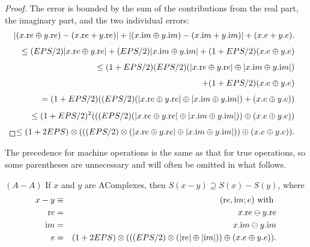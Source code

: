 \begin{proof}{}
The error is bounded by the sum of the contributions from the real part, the imaginary part, and the two individual errors:
\begin{eqnarray*}
 & &\hskip-20pt |(x.{\mathrm re} \oplus y.{\mathrm re}) -(x.{\mathrm re} + y.{\mathrm re})| + |(x.{\mathrm im} \oplus y.{\mathrm im}) -
(x.{\mathrm im} + y.{\mathrm im})| + (x.e + y.e).\\[4pt]
&&\hskip-12pt \le (EPS/2) |x.{\mathrm re} \oplus y.{\mathrm re}| + (EPS/2) |x.{\mathrm im} \oplus y.{\mathrm im}| + 
(1 + EPS/2) (x.e \oplus y.e)\\[4pt]
&&\hskip-12pt \le  (1 + EPS/2) (EPS/2)(|x.{\mathrm re} \oplus y.{\mathrm re}| \oplus 
 |x.{\mathrm im} \oplus y.{\mathrm im}| ) \\[4pt]
&&\hskip-12pt \qquad + (1 + EPS/2) (x.e \oplus y.e)\\[4pt]
&&\hskip-12pt = (1 + EPS/2) ((EPS/2)(|x.{\mathrm re} \oplus y.{\mathrm re}| \oplus 
 |x.{\mathrm im} \oplus y.{\mathrm im}| ) + (x.e \oplus y.e))\\[4pt]
&&\hskip-12pt \le (1 + EPS/2)^2 (((EPS/2) (|x.{\mathrm re} \oplus y.{\mathrm re}| \oplus 
 |x.{\mathrm im} \oplus y.{\mathrm im}| )) \oplus  (x.e \oplus y.e))\\[4pt]
&&\hskip-12pt \le   (1 + 2 EPS) \otimes (((EPS/2)\otimes (|x.{\mathrm re} \oplus
y.{\mathrm re}| \oplus |x.{\mathrm im} \oplus y.{\mathrm im}| )) \oplus (x.e \oplus y.e)).\\[4pt]
\noalign{\vskip-24pt}
\end{eqnarray*}
\end{proof}

The precedence for machine operations is the same as that for true operations, so some  parentheses are unnecessary
and will often be omitted in what
 follows.

\begin{proposition}\label{GMT 7.7}{$(A - A)$}
If $x$ and $y$ are {\textrm AComplexes,} then 
$S(x - y) \supseteq S(x) - S(y)${\textrm ,} where
\begin{eqnarray*}
x-y &\equiv& ({\mathrm re},{\mathrm im};e) \hbox{ with }\\
{\mathrm re}& =& x.{\mathrm re} \ominus y.{\mathrm re}\\
{\mathrm im}& =& x.{\mathrm im} \ominus y.{\mathrm im}\\
e &=& (1 + 2 EPS) \otimes ( ((EPS/2) \otimes (|{\mathrm re}| \oplus |{\mathrm im}|))
 \oplus (x.e \oplus y.e)).
\end{eqnarray*}
\end{proposition}


